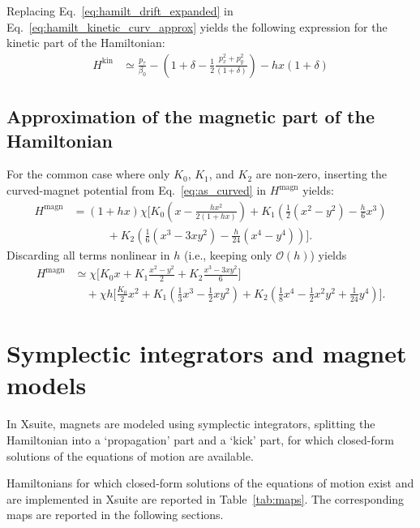 Replacing Eq.~\eqref{eq:hamilt_drift_expanded} in Eq.~\eqref{eq:hamilt_kinetic_curv_approx}
yields the following expression for the kinetic part of the Hamiltonian:
\begin{align}
  H^\text{kin}
    &\simeq  \frac{p_\tau}{\beta_0}
    - \left(1 + \delta  - \frac{1}{2}\frac{p_x^2 + p_y^2}{(1 + \delta)}\right)
    - h x \left(1 + \delta\right)
\end{align}

\subsection{Approximation of the magnetic part of the Hamiltonian}

For the common case where only $K_0$, $K_1$, and $K_2$ are non-zero, inserting
the curved-magnet potential from Eq.~\eqref{eq:as_curved} in $H^\text{magn}$ yields:
\begin{align}
  H^\text{magn} &= (1+h x)\chi \Bigg[
    K_0\left(x-\frac{h x^{2}}{2(1+h x)}\right)
    + K_1\left(\frac{1}{2}(x^{2}-y^{2})-\frac{h}{6}x^{3}\right) \nonumber\\
  &\qquad\quad
    + K_2\left(\frac{1}{6}(x^{3}-3xy^{2})-\frac{h}{24}(x^{4}-y^{4})\right)
  \Bigg].
\end{align}
Discarding all terms nonlinear in $h$ (i.e., keeping only $\mathcal{O}(h)$) yields
\begin{align}
  H^\text{magn} &\simeq \chi \Bigg[
    K_0 x
    + K_1 \frac{x^{2}-y^{2}}{2}
    + K_2 \frac{x^{3}-3xy^{2}}{6}
  \Bigg] \nonumber\\
  &\quad + \chi h \Bigg[
    \frac{K_0}{2} x^{2}
    + K_1 \left(\frac{1}{3}x^{3}-\frac{1}{2}x y^{2}\right)
    + K_2 \left(\frac{1}{8}x^{4}-\frac{1}{2}x^{2}y^{2}+\frac{1}{24}y^{4}\right)
  \Bigg].
\end{align}


\section{Symplectic integrators and magnet models}

In Xsuite, magnets are modeled using symplectic integrators, splitting the Hamiltonian
into a `propagation' part and a `kick' part, for which closed-form solutions of the equations of motion
are available.

Hamiltonians for which closed-form solutions of the equations of motion exist and are
implemented in Xsuite are reported in Table~\ref{tab:maps}. The corresponding
maps are reported in the following sections.

